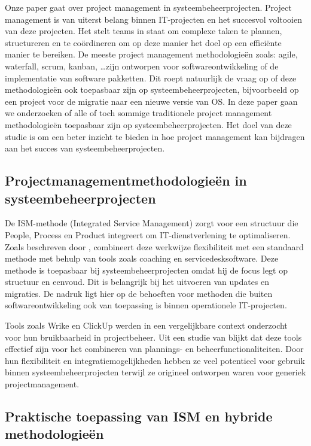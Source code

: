 \documentclass{article}
\begin{document}
    Onze paper gaat over project management in systeembeheerprojecten. 
    Project management is van uiterst belang binnen IT-projecten en het succesvol voltooien van deze projecten. 
    Het stelt teams in staat om complexe taken te plannen, structureren en te coördineren om op deze manier het doel op een efficiënte manier te bereiken.
    De meeste project management methodologieën zoals: agile, waterfall, scrum, kanban, \ldots zijn ontworpen voor softwareontwikkeling of de implementatie van software pakketten.
    Dit roept natuurlijk de vraag op of deze methodologieën ook toepasbaar zijn op systeembeheerprojecten, bijvoorbeeld op een project voor de migratie naar een nieuwe versie van OS.
    In deze paper gaan we onderzoeken of alle of toch sommige traditionele project management methodologieën toepasbaar zijn op systeembeheerprojecten.
    Het doel van deze studie is om een beter inzicht te bieden in hoe project management kan bijdragen aan het succes van systeembeheerprojecten. 

    \subsection{Projectmanagementmethodologieën in systeembeheerprojecten}

    De ISM-methode (Integrated Service Management) zorgt voor een structuur die People, Process en Product integreert om IT-dienstverlening te optimaliseren. 
    Zoals beschreven door \textcite{hoving2010ism}, combineert deze werkwijze flexibiliteit met een standaard methode met behulp van tools zoals coaching en servicedesksoftware.
    Deze methode is toepasbaar bij systeembeheerprojecten omdat hij de focus legt op structuur en eenvoud. Dit is belangrijk bij het uitvoeren van updates en migraties.
    De nadruk ligt hier op de behoeften voor methoden die buiten softwareontwikkeling ook van toepassing is binnen operationele IT-projecten. \autocite{hoving2010ism}

    Tools zoals Wrike en ClickUp werden in een vergelijkbare context onderzocht voor hun bruikbaarheid in projectbeheer.
    Uit een studie van \textcite{pasaric2022comparison} blijkt dat deze tools effectief zijn voor het combineren van plannings- en beheerfunctionaliteiten.
    Door hun flexibiliteit en integratiemogelijkheden hebben ze veel potentieel voor gebruik binnen systeembeheerprojecten terwijl ze origineel ontworpen waren voor generiek projectmanagement. \autocite{pasaric2022comparison}

    \newpage
    \subsection{Praktische toepassing van ISM en hybride methodologieën}
\end{document}
